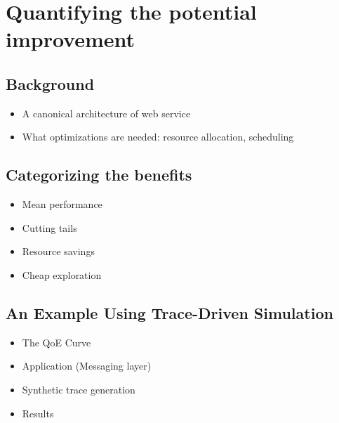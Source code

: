 \documentclass{proposalnsf}
\begin{document}








\newpage
\section{Quantifying the potential improvement}

\subsection{Background}
\begin{itemize}
\item A canonical architecture of web service
\item What optimizations are needed: resource allocation, scheduling
\end{itemize}

\subsection{Categorizing the benefits}
\begin{itemize}

\item Mean performance

\item Cutting tails

\item Resource savings

\item Cheap exploration

\end{itemize}

\subsection{An Example Using Trace-Driven Simulation}
\begin{itemize}

\item The QoE Curve

\item Application (Messaging layer)

\item Synthetic trace generation

\item Results

\end{itemize}
\end{document}
